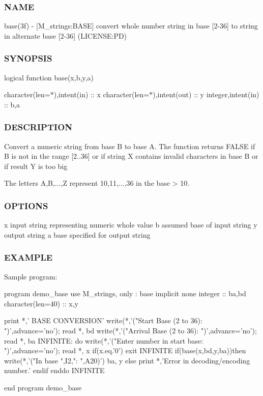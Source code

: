 \subsubsection*{N\+A\+ME}

base(3f) -\/ \mbox{[}M\+\_\+strings\+:B\+A\+SE\mbox{]} convert whole number string in base \mbox{[}2-\/36\mbox{]} to string in alternate base \mbox{[}2-\/36\mbox{]} (L\+I\+C\+E\+N\+SE\+:PD) 

\subsubsection*{S\+Y\+N\+O\+P\+S\+IS}

logical function base(x,b,y,a)

character(len=$\ast$),intent(in) \+:\+: x character(len=$\ast$),intent(out) \+:\+: y integer,intent(in) \+:\+: b,a \subsubsection*{D\+E\+S\+C\+R\+I\+P\+T\+I\+ON}

\begin{DoxyVerb}Convert a numeric string from base B to base A. The function returns
FALSE if B is not in the range [2..36] or if string X contains invalid
characters in base B or if result Y is too big

The letters A,B,...,Z represent 10,11,...,36 in the base > 10.
\end{DoxyVerb}


\subsubsection*{O\+P\+T\+I\+O\+NS}

x input string representing numeric whole value b assumed base of input string y output string a base specified for output string

\subsubsection*{E\+X\+A\+M\+P\+LE}

Sample program\+: \begin{DoxyVerb}program demo_base
use M_strings, only : base
implicit none
integer           :: ba,bd
character(len=40) :: x,y

print *,' BASE CONVERSION'
write(*,'("Start   Base (2 to 36): ")',advance='no'); read *, bd
write(*,'("Arrival Base (2 to 36): ")',advance='no'); read *, ba
INFINITE: do
   write(*,'("Enter number in start base: ")',advance='no'); read *, x
   if(x.eq.'0') exit INFINITE
   if(base(x,bd,y,ba))then
        write(*,'("In base ",I2,": ",A20)')  ba, y
    else
      print *,'Error in decoding/encoding number.'
    endif
 enddo INFINITE

 end program demo_base
\end{DoxyVerb}


